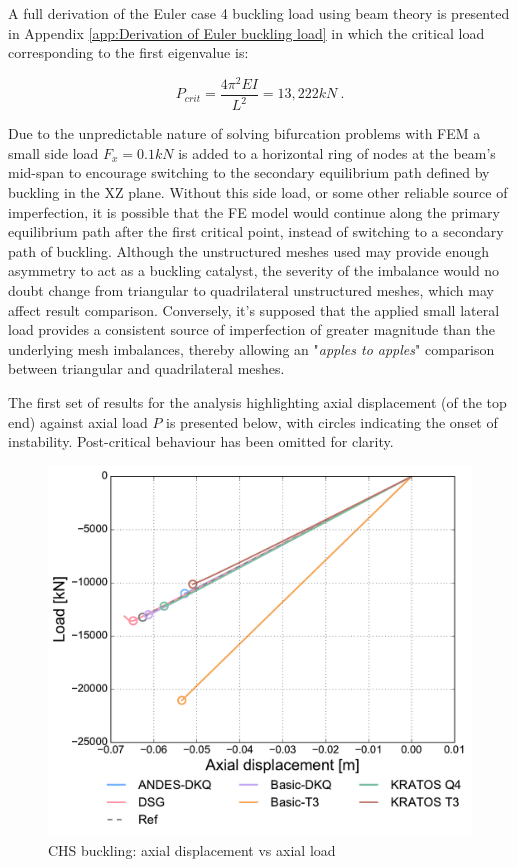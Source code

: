 A full derivation of the Euler case 4 buckling load using beam theory is presented in Appendix \ref{app:Derivation of Euler buckling load} in which the critical load corresponding to the first eigenvalue is:

\begin{equation} 
P_{crit} = \frac{4\pi^2 EI}{L^2} = 13, 222 kN
\label{eqchs_1}\ .
\end{equation}

Due to the unpredictable nature of solving bifurcation problems with FEM a small side load $F_x = 0.1 kN$ is added to a horizontal ring of nodes at the beam's mid-span to encourage switching to the secondary equilibrium path defined by buckling in the XZ plane. Without this side load, or some other reliable source of imperfection, it is possible that the FE model would continue along the primary equilibrium path after the first critical point, instead of switching to a secondary path of buckling. Although the unstructured meshes used may provide enough asymmetry to act as a buckling catalyst, the severity of the imbalance would no doubt change from triangular to quadrilateral unstructured meshes, which may affect result comparison. Conversely, it's supposed that the applied small lateral load provides a consistent source of imperfection  of greater magnitude than the underlying mesh imbalances, thereby allowing an "\textit{apples to apples}" comparison between triangular and quadrilateral meshes.

The first set of results for the analysis highlighting axial displacement (of the top end) against axial load $P$ is presented below, with circles indicating the onset of instability. Post-critical behaviour has been omitted for clarity.

\begin{figure}[H]
	\centering
	\def\svgwidth{\columnwidth}
	\includegraphics[width=12cm]{images/stability_chs_axial_disp.pdf}
	\caption{CHS buckling: axial displacement vs axial load}
	\label{pic:eulerchs1}
\end{figure}

